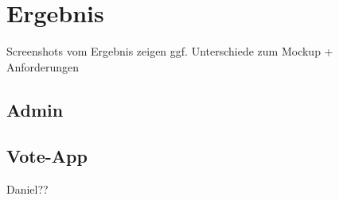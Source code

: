 \section{Ergebnis}

Screenshots vom Ergebnis zeigen
ggf. Unterschiede zum Mockup + Anforderungen

\subsection{Admin}

\subsection{Vote-App}

Daniel??